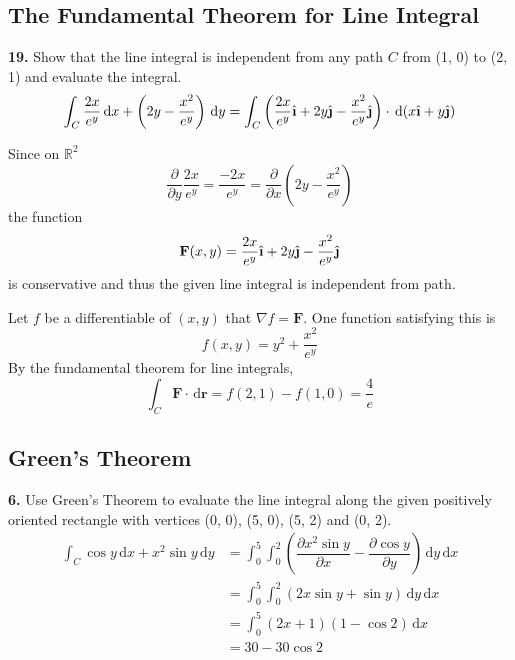 \documentclass[a4paper,12pt]{article}
\newcommand{\ud}{\,\mathrm{d}}
\newcommand{\unit}[1]{\hat{\textbf #1}}
\newcommand{\tho}[3][]{\dfrac{\partial #1 #2}{\partial #3 #1}}
\newcommand{\exercise}[1]{\noindent\textbf{#1.}}
\begin{document}
\subsection{The Fundamental Theorem for Line Integral}
\exercise{19} Show that the line integral is independent
from any path $C$ from (1, 0) to (2, 1) and evaluate the integral.
\[\int_C\frac{2x}{e^y}\ud x + \left(2y - \frac{x^2}{e^y}\right)\ud y
= \int_C\left(\frac{2x}{e^y}\unit\i + 2y\unit\j - \frac{x^2}{e^y}\unit\j\right)
\cdot\ud(x\unit\i + y\unit\j)\]

Since on $\mathbb R^2$
\[\tho{}{y}\frac{2x}{e^y} = \frac{-2x}{e^y}
= \tho{}{x}\left(2y - \frac{x^2}{e^y}\right)\]
the function
\[\mathbf F(x, y) = \frac{2x}{e^y}\unit\i + 2y\unit\j - \frac{x^2}{e^y}\unit\j\]
is conservative and thus the given line integral is independent from path.

Let $f$ be a differentiable of $(x, y)$ that $\nabla f = \mathbf F$.
One function satisfying this is \[f(x, y) = y^2 + \frac{x^2}{e^y}\]
By the fundamental theorem for line integrals,
\[\int_C\mathbf F\cdot\ud\mathbf r = f(2, 1) - f(1, 0) = \frac{4}{e}\]

\subsection{Green's Theorem}
\exercise{6} Use Green’s Theorem to evaluate the line integral along the given
positively oriented rectangle with vertices (0, 0), (5, 0), (5, 2) and (0, 2).
\begin{align*}
   \int_C\cos y\ud x + x^2\sin y\ud y
&= \int_0^5\int_0^2\left(\tho{x^2\sin y}{x} - \tho{\cos y}{y}\right)\ud y\ud x\\
&= \int_0^5\int_0^2(2x\sin y + \sin y)\ud y\ud x\\
&= \int_0^5(2x + 1)(1 - \cos 2)\ud x\\
&= 30 - 30\cos 2
\end{align*}
\end{document}
